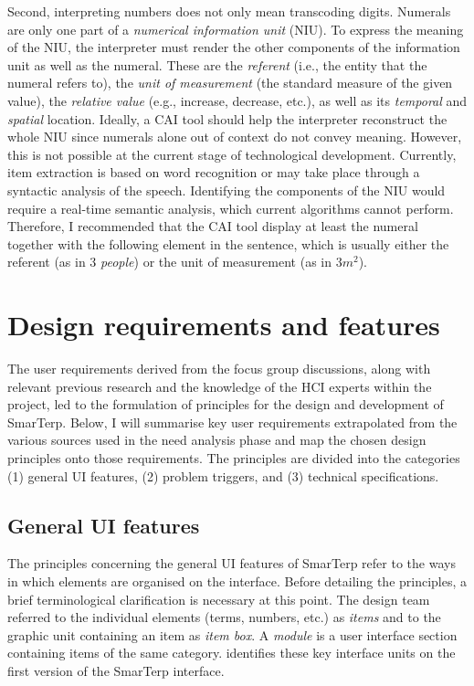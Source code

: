 Second, interpreting numbers does not only mean transcoding digits. Numerals are only one part of a \textit{numerical information unit} (NIU). To express the meaning of the NIU, the interpreter must render the other components of the information unit as well as the numeral. These are the \textit{referent} (i.e., the entity that the numeral refers to), the \textit{unit of measurement} (the standard measure of the given value), the \textit{relative value} (e.g., increase, decrease, etc.), as well as its \textit{temporal} and \textit{spatial} location. Ideally, a CAI tool should help the interpreter reconstruct the whole NIU since numerals alone out of context do not convey meaning. However, this is not possible at the current stage of technological development. Currently, item extraction is based on word recognition or may take place through a syntactic analysis of the speech. Identifying the components of the NIU would require a real-time semantic analysis, which current algorithms cannot perform. Therefore, I recommended that the CAI tool display at least the numeral together with the following element in the sentence, which is usually either the referent (as in 3 \textit{people}) or the unit of measurement (as in $3m^2$).









\section{Design requirements and features}

The user requirements derived from the focus group discussions, along with relevant previous research and the knowledge of the HCI experts within the project, led to the formulation of principles for the design and development of SmarTerp. Below, I will summarise key user requirements extrapolated from the various sources used in the need analysis phase and map the chosen design principles onto those requirements. The principles are divided into the categories (1) general UI features, (2) problem triggers, and (3) technical specifications.



\subsection{General UI features}


The principles concerning the general UI features of SmarTerp refer to the ways in which elements are organised on the interface. Before detailing the principles, a brief terminological clarification is necessary at this point. The design team referred to the individual elements (terms, numbers, etc.) as \textit{items} and to the graphic unit containing an item as \textit{item box}. A \textit{module} is a user interface section containing items of the same category.  identifies these key interface units on the first version of the SmarTerp interface.

